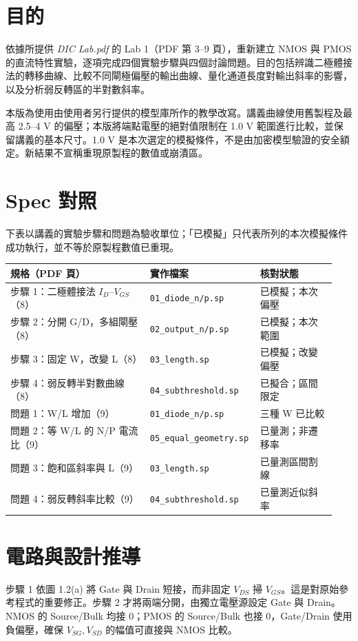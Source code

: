 \section{目的}
依據所提供 \textit{DIC Lab.pdf} 的 Lab 1（PDF 第 3--9 頁），重新建立 NMOS 與 PMOS 的直流特性實驗，逐項完成四個實驗步驟與四個討論問題。目的包括辨識二極體接法的轉移曲線、比較不同閘極偏壓的輸出曲線、量化通道長度對輸出斜率的影響，以及分析弱反轉區的半對數斜率。

本版為使用由使用者另行提供的模型庫所作的教學改寫。講義曲線使用舊製程及最高 2.5--4 V 的偏壓；本版將端點電壓的絕對值限制在 1.0 V 範圍進行比較，並保留講義的基本尺寸。1.0 V 是本次選定的模擬條件，不是由加密模型驗證的安全額定。新結果不宣稱重現原製程的數值或崩潰區。

\section{Spec 對照}
下表以講義的實驗步驟和問題為驗收單位；「已模擬」只代表所列的本次模擬條件成功執行，並不等於原製程數值已重現。
\begin{center}
\setlength{\tabcolsep}{3pt}
\begin{tabular}{p{0.42\linewidth}p{0.29\linewidth}p{0.23\linewidth}}
\toprule
規格（PDF 頁） & 實作檔案 & 核對狀態 \\
\midrule
步驟 1：二極體接法 $I_D$--$V_{GS}$（8） & \texttt{01\_diode\_n/p.sp} & 已模擬；本次偏壓 \\
步驟 2：分開 G/D，多組閘壓（8） & \texttt{02\_output\_n/p.sp} & 已模擬；本次範圍 \\
步驟 3：固定 W，改變 L（8） & \texttt{03\_length.sp} & 已模擬；改變偏壓 \\
步驟 4：弱反轉半對數曲線（8） & \texttt{04\_subthreshold.sp} & 已擬合；區間限定 \\
問題 1：W/L 增加（9） & \texttt{01\_diode\_n/p.sp} & 三種 W 已比較 \\
問題 2：等 W/L 的 N/P 電流比（9） & \texttt{05\_equal\_geometry.sp} & 已量測；非遷移率 \\
問題 3：飽和區斜率與 L（9） & \texttt{03\_length.sp} & 已量測區間割線 \\
問題 4：弱反轉斜率比較（9） & \texttt{04\_subthreshold.sp} & 已量測近似斜率 \\
\bottomrule
\end{tabular}
\end{center}

\section{電路與設計推導}
步驟 1 依圖 1.2(a) 將 Gate 與 Drain 短接，而非固定 $V_{DS}$ 掃 $V_{GS}$。這是對原始參考程式的重要修正。步驟 2 才將兩端分開，由獨立電壓源設定 Gate 與 Drain。NMOS 的 Source/Bulk 均接 0；PMOS 的 Source/Bulk 也接 0，Gate/Drain 使用負偏壓，確保 $V_{SG},V_{SD}$ 的幅值可直接與 NMOS 比較。


